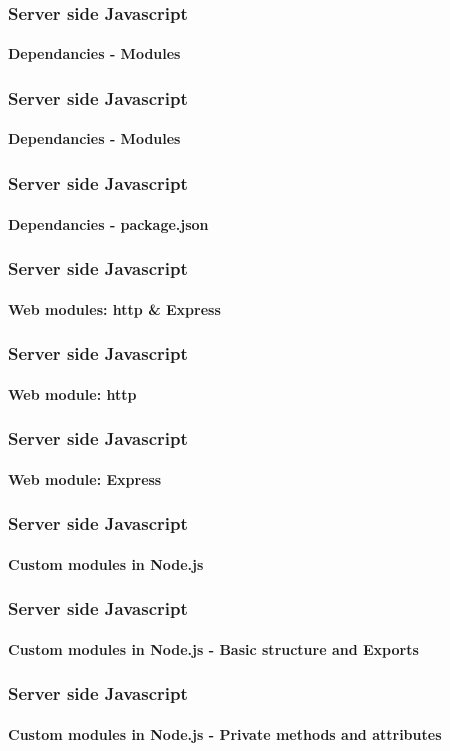 \documentclass{beamer}
\begin{document}
	\begin{frame}
		\frametitle{Server side Javascript}
		\framesubtitle{Dependancies - Modules}
	\end{frame}

	\begin{frame}[fragile]
		\frametitle{Server side Javascript}
		\framesubtitle{Dependancies - Modules}
	\end{frame}

	\begin{frame}
		\frametitle{Server side Javascript}
		\framesubtitle{Dependancies - package.json}
	\end{frame}
	\begin{frame}
		\frametitle{Server side Javascript}
		\framesubtitle{Web modules: http \& Express}
	\end{frame}
	\begin{frame}
		\frametitle{Server side Javascript}
		\framesubtitle{Web module: http}
	\end{frame}
	\begin{frame}
		\frametitle{Server side Javascript}
		\framesubtitle{Web module: Express}
	\end{frame}
	\begin{frame}
		\frametitle{Server side Javascript}
		\framesubtitle{Custom modules in Node.js}
	\end{frame}
	\begin{frame}
		\frametitle{Server side Javascript}
		\framesubtitle{Custom modules in Node.js - Basic structure and Exports}
	\end{frame}
	\begin{frame}
		\frametitle{Server side Javascript}
		\framesubtitle{Custom modules in Node.js - Private methods and attributes}
	\end{frame}
\end{document}
